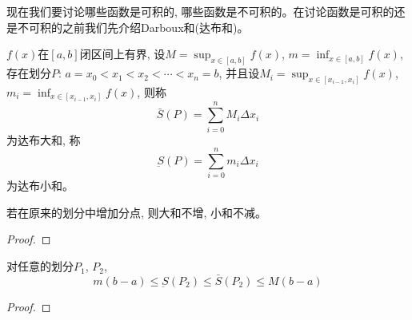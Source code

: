 现在我们要讨论哪些函数是可积的, 哪些函数是不可积的。在讨论函数是可积的还是不可积的之前我们先介绍Darboux和(达布和)。
\begin{definition}
    $f(x)$在$[a, b]$闭区间上有界, 设$M=\sup_{x\in [a, b]} f(x)$, $m=\inf_{x\in [a, b]} f(x)$, 存在划分$P$: $a = x_0 < x_1 < x_2 < \cdots < x_n = b$, 并且设$M_i = \sup_{x\in [x_{i-1}, x_i]} f(x)$, $m_i=\inf_{x\in [x_{i-1}, x_i]} f(x)$, 则称
    \begin{equation*}
        \bar{S}(P) = \sum_{i=0}^n M_i\Delta x_i
    \end{equation*}
    为达布大和, 称
    \begin{equation*}
        \underbar{S}(P) = \sum_{i=0}^n m_i\Delta x_i
    \end{equation*}
    为达布小和。
\end{definition}

\begin{lemma}
    若在原来的划分中增加分点, 则大和不增, 小和不减。
\end{lemma}
\begin{proof}
    
\end{proof}

\begin{lemma}
    对任意的划分$P_1$, $P_2$,
    \begin{equation*}
        m(b-a) \le \underbar{S}(P_2) \le \bar{S}(P_2) \le M(b-a)
    \end{equation*}
\end{lemma}
\begin{proof}
    
\end{proof}

